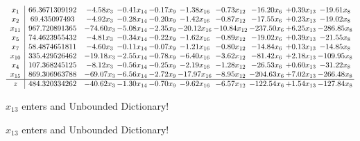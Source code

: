 \documentclass[9pt]{article}
\begin{document}
 \[\begin{array}{c| c c@{\hskip 2pt} c@{\hskip 2pt} c@{\hskip 2pt} c@{\hskip 2pt} c@{\hskip 2pt} c@{\hskip 2pt} c@{\hskip 2pt} c@{\hskip 2pt} }
 x_{1}   &  66.3671309192 & -4.58 x_{3} & -0.41 x_{14} & -0.17 x_{9} & -1.38 x_{16} & -0.73 x_{12} & -16.20 x_{6} & +  0.39 x_{13} & -19.61 x_{8}\\
 x_{2}   &  69.435097493 & -4.92 x_{3} & -0.28 x_{14} & -0.20 x_{9} & -1.42 x_{16} & -0.87 x_{12} & -17.55 x_{6} & +  0.23 x_{13} & -19.02 x_{8}\\
 x_{11}   &  967.720891365 & -74.60 x_{3} & -5.08 x_{14} & -2.35 x_{9} & -20.12 x_{16} & -10.84 x_{12} & -237.50 x_{6} & +  6.25 x_{13} & -286.85 x_{8}\\
 x_{5}   &  74.4623955432 & -4.81 x_{3} & -0.34 x_{14} & -0.22 x_{9} & -1.62 x_{16} & -0.89 x_{12} & -19.02 x_{6} & +  0.39 x_{13} & -21.55 x_{8}\\
 x_{7}   &  58.4874651811 & -4.60 x_{3} & -0.11 x_{14} & -0.07 x_{9} & -1.21 x_{16} & -0.80 x_{12} & -14.84 x_{6} & +  0.13 x_{13} & -14.85 x_{8}\\
 x_{10}   &  335.429526462 & -19.18 x_{3} & -2.55 x_{14} & -0.78 x_{9} & -6.40 x_{16} & -3.62 x_{12} & -81.42 x_{6} & +  2.18 x_{13} & -109.95 x_{8}\\
 x_{4}   &  107.368245125 & -8.12 x_{3} & -0.56 x_{14} & -0.25 x_{9} & -2.19 x_{16} & -1.28 x_{12} & -26.53 x_{6} & +  0.60 x_{13} & -31.22 x_{8}\\
 x_{15}   &  869.306963788 & -69.07 x_{3} & -6.56 x_{14} & -2.72 x_{9} & -17.97 x_{16} & -8.95 x_{12} & -204.63 x_{6} & +  7.02 x_{13} & -266.48 x_{8}\\
\hline
z    &  484.320334262 & -40.62 x_{3} & -1.30 x_{14} & -0.70 x_{9} & -9.62 x_{16} & -6.57 x_{12} & -122.54 x_{6} & +  1.54 x_{13} & -127.84 x_{8}\\
\end{array}\]


 $ x_{13} $ enters and Unbounded Dictionary!


 $ x_{13} $ enters and Unbounded Dictionary!
\end{document}
